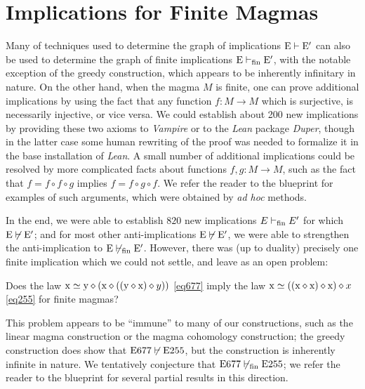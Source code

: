 \section{Implications for Finite Magmas}\label{austin-sec}

Many of techniques used to determine the graph of implications $\mathrm{E} \vdash \mathrm{E}'$ can also be used to determine the graph of finite implications $\mathrm{E} \vdash_{\mathrm{fin}} \mathrm{E}'$, with the notable exception of the greedy construction, which appears to be inherently infinitary in nature.  On the other hand, when the magma $M$ is finite, one can prove additional implications by using the fact that any function $f \colon M \to M$ which is surjective, is necessarily injective, or vice versa.  We could establish about 200 new implications by providing these two axioms to \emph{Vampire} or to the \emph{Lean} package \emph{Duper}, though in the latter case some human rewriting of the proof was needed to formalize it in the base installation of \emph{Lean}.  A small number of additional implications could be resolved by more complicated facts about functions $f,g \colon M \to M$, such as the fact that $f = f \circ f \circ g$ implies $f = f \circ g \circ f$.  We refer the reader to the blueprint for examples of such arguments, which were obtained by \emph{ad hoc} methods.

In the end, we were able to establish $820$ new implications $E \vdash_{\mathrm{fin}} E'$ for which $\mathrm{E} \not \vdash \mathrm{E}'$; and for most other anti-implications $\mathrm{E} \not \vdash \mathrm{E}'$, we were able to strengthen the anti-implication to $\mathrm{E} \not \vdash_{\mathrm{fin}} \mathrm{E}'$.  However, there was (up to duality) precisely one finite implication which we could not settle, and leave as an open problem:

\begin{problem}  Does the law $\mathrm{x} \simeq \mathrm{y} \diamond (\mathrm{x} \diamond ((\mathrm{y} \diamond \mathrm{x}) \diamond y))$ \eqref{eq677} imply the law $\mathrm{x} \simeq ((\mathrm{x} \diamond \mathrm{x}) \diamond \mathrm{x}) \diamond x$ \eqref{eq255} for finite magmas?
\end{problem}

This problem appears to be ``immune'' to many of our constructions, such as the linear magma construction or the magma cohomology construction; the greedy construction does show that $\mathrm{E}677 \not \vdash \mathrm{E}255$, but the construction is inherently infinite in nature.  We tentatively conjecture that $\mathrm{E}677 \not \vdash_{\mathrm{fin}} \mathrm{E}255$; we refer the reader to the blueprint for several partial results in this direction.
